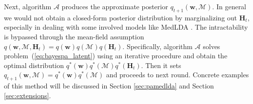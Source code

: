 \documentclass[twoside,11pt]{article}
\newcommand{\Hv}{\bm{H}}
\newcommand{\algo}{\mathcal{A}}
\newcommand{\wv}{\bm{w}}
\newcommand{\Mv}{\bm{\mathcal{M}}}
\begin{document}
Next, algorithm $\algo$ produces the approximate posterior $q_{t+1}(\wv, \Mv)$. In general we would not obtain a closed-form posterior distribution by marginalizing out $\Hv_t$, especially in dealing with some involved models like MedLDA \citep{zhu2012medlda}. The intractability is bypassed through the mean-field assumption $q(\wv, \Mv, \Hv_t) = q(\wv) q(\Mv) q(\Hv_t)$. Specifically, algorithm $\algo$ solves problem~(\ref{eq:bayespa_latent}) using an iterative procedure and obtain the optimal distribution $q^*(\wv) q^*(\Mv) q^*(\Hv_t)$. Then it sets $q_{t+1}(\wv, \Mv) = q^*(\wv) q^*(\Mv)$ and proceeds to next round. Concrete examples of this method will be discussed in Section \ref{sec:pamedlda} and Section \ref{sec:extensions}.

\end{document}
